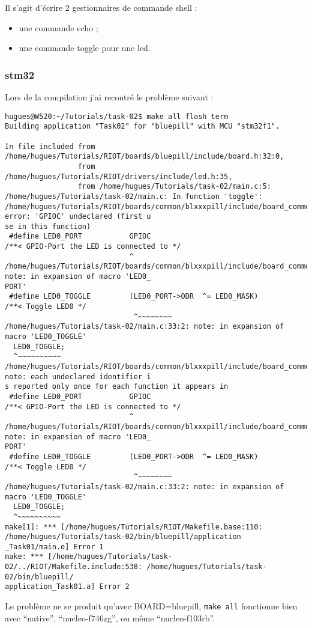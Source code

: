 Il s'agit d'écrire 2 gestionnaires de commande shell :
\begin{itemize}
	\item une commande echo ;
	\item une commande toggle pour une led.\\
\end{itemize}

\subsubsection{stm32}
Lors de la compilation j'ai recontré le problème suivant :
{\scriptsize
\begin{verbatim}
hugues@W520:~/Tutorials/task-02$ make all flash term
Building application "Task02" for "bluepill" with MCU "stm32f1".

In file included from /home/hugues/Tutorials/RIOT/boards/bluepill/include/board.h:32:0,
                 from /home/hugues/Tutorials/RIOT/drivers/include/led.h:35,
                 from /home/hugues/Tutorials/task-02/main.c:5:
/home/hugues/Tutorials/task-02/main.c: In function 'toggle':
/home/hugues/Tutorials/RIOT/boards/common/blxxxpill/include/board_common.h:36:29: error: 'GPIOC' undeclared (first u
se in this function)
 #define LED0_PORT           GPIOC                                   /**< GPIO-Port the LED is connected to */
                             ^
/home/hugues/Tutorials/RIOT/boards/common/blxxxpill/include/board_common.h:49:30: note: in expansion of macro 'LED0_
PORT'
 #define LED0_TOGGLE         (LED0_PORT->ODR  ^= LED0_MASK)          /**< Toggle LED0 */
                              ^~~~~~~~~
/home/hugues/Tutorials/task-02/main.c:33:2: note: in expansion of macro 'LED0_TOGGLE'
  LED0_TOGGLE;
  ^~~~~~~~~~~
/home/hugues/Tutorials/RIOT/boards/common/blxxxpill/include/board_common.h:36:29: note: each undeclared identifier i
s reported only once for each function it appears in
 #define LED0_PORT           GPIOC                                   /**< GPIO-Port the LED is connected to */
                             ^
/home/hugues/Tutorials/RIOT/boards/common/blxxxpill/include/board_common.h:49:30: note: in expansion of macro 'LED0_
PORT'
 #define LED0_TOGGLE         (LED0_PORT->ODR  ^= LED0_MASK)          /**< Toggle LED0 */
                              ^~~~~~~~~
/home/hugues/Tutorials/task-02/main.c:33:2: note: in expansion of macro 'LED0_TOGGLE'
  LED0_TOGGLE;
  ^~~~~~~~~~~
make[1]: *** [/home/hugues/Tutorials/RIOT/Makefile.base:110: /home/hugues/Tutorials/task-02/bin/bluepill/application
_Task01/main.o] Error 1
make: *** [/home/hugues/Tutorials/task-02/../RIOT/Makefile.include:538: /home/hugues/Tutorials/task-02/bin/bluepill/
application_Task01.a] Error 2
\end{verbatim}
}
Le problème ne se produit qu'avec BOARD=bluepill, \texttt{make all}
fonctionne bien avec \enquote{native}, \enquote{nucleo-f746zg}, ou même
\enquote{nucleo-f103rb}.\\

